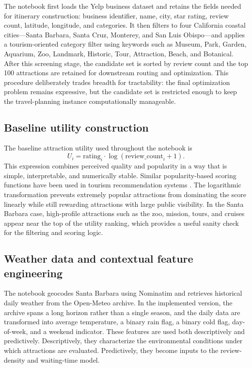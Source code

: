 \documentclass[12pt,a4paper]{article}
\begin{document}
The notebook first loads the Yelp business dataset\cite{yelp_dataset} and retains the fields needed for itinerary construction: business identifier, name, city, star rating, review count, latitude, longitude, and categories. It then filters to four California coastal cities---Santa Barbara, Santa Cruz, Monterey, and San Luis Obispo---and applies a tourism-oriented category filter using keywords such as Museum, Park, Garden, Aquarium, Zoo, Landmark, Historic, Tour, Attraction, Beach, and Botanical. After this screening stage, the candidate set is sorted by review count and the top 100 attractions are retained for downstream routing and optimization. This procedure deliberately trades breadth for tractability: the final optimization problem remains expressive, but the candidate set is restricted enough to keep the travel-planning instance computationally manageable.

\subsection{Baseline utility construction}

The baseline attraction utility used throughout the notebook is
\[
U_i = \text{rating}_i \cdot \log(\text{review\_count}_i + 1).
\]
This expression combines perceived quality and popularity in a way that is simple, interpretable, and numerically stable. Similar popularity-based scoring functions have been used in tourism recommendation systems \cite{borras2014tourismsurvey,yuan2013timeaware}. The logarithmic transformation prevents extremely popular attractions from dominating the score linearly while still rewarding attractions with large public visibility. In the Santa Barbara case, high-profile attractions such as the zoo, mission, tours, and cruises appear near the top of the utility ranking, which provides a useful sanity check for the filtering and scoring logic.

\subsection{Weather data and contextual feature engineering}

The notebook geocodes Santa Barbara using Nominatim and retrieves historical daily weather from the Open-Meteo archive\cite{openmeteo}. In the implemented version, the archive spans a long horizon rather than a single season, and the daily data are transformed into average temperature, a binary rain flag, a binary cold flag, day-of-week, and a weekend indicator. These features are used both descriptively and predictively. Descriptively, they characterize the environmental conditions under which attractions are evaluated. Predictively, they become inputs to the review-density and waiting-time model.
\end{document}
